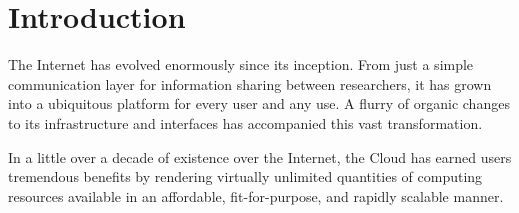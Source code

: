 \section{Introduction}
\label{sec:introduction}

The Internet has evolved enormously since its inception. From just a simple communication layer for information sharing between researchers, it has grown into a ubiquitous platform for every user and any use. 
A flurry of organic changes to its infrastructure and interfaces has accompanied this vast transformation.

In a little over a decade of existence over the Internet, the Cloud has earned users tremendous benefits by rendering virtually unlimited quantities of computing resources available in an affordable, fit-for-purpose, and rapidly scalable manner.


